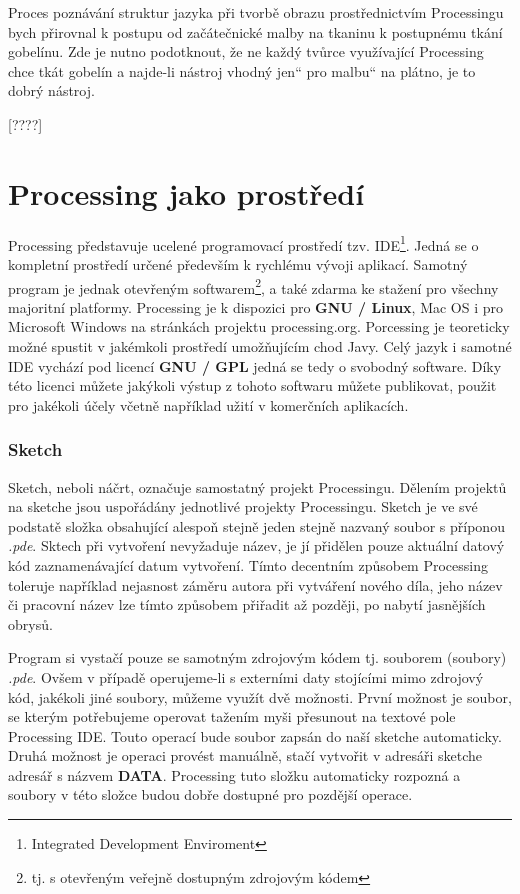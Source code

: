 \documentclass[11pt]{book}
\renewcommand\uv[1]{\quotedblbase #1\textquotedblleft}%
\newcommand{\pododdil}[1]{\subsection{#1}\label{subsec:#1}}
\newcommand{\slovnik}[1]{\textbf{\gls{#1}}\index{#1}}
\begin{document}
Proces poznávání struktur jazyka při tvorbě obrazu prostřednictvím Processingu bych přirovnal k postupu od začátečnické malby na tkaninu k postupnému tkání gobelínu. Zde je nutno podotknout, že ne každý tvůrce využívající Processing chce tkát gobelín a najde-li nástroj vhodný \uv{jen} pro \uv{malbu} na plátno, je to dobrý nástroj.


[????]

\chapter{Processing jako prostředí}


Processing představuje ucelené programovací prostředí tzv. IDE\footnote{Integrated Development Enviroment}. Jedná se o kompletní prostředí určené především k rychlému vývoji aplikací. Samotný program je jednak otevřeným softwarem\footnote{tj. s otevřeným veřejně dostupným zdrojovým kódem}, a také zdarma ke stažení pro všechny majoritní platformy. Processing je k dispozici pro \slovnik{GNU / Linux}, Mac OS i pro Microsoft Windows na stránkách projektu processing.org. Porcessing je teoreticky možné spustit v jakémkoli prostředí umožňujícím chod Javy. Celý jazyk i samotné IDE vychází pod licencí \slovnik{GNU / GPL} jedná se tedy o svobodný software. Díky této licenci můžete jakýkoli výstup z tohoto softwaru můžete publikovat, použit pro jakékoli účely včetně například užití v komerčních aplikacích.


\pododdil{Sketch}

Sketch, neboli náčrt, označuje samostatný projekt Processingu. Dělením projektů na sketche jsou uspořádány jednotlivé projekty Processingu. Sketch je ve své podstatě složka obsahující alespoň stejně jeden stejně nazvaný soubor s příponou {\em *.pde}. Sktech při vytvoření nevyžaduje název, je jí přidělen pouze aktuální datový kód zaznamenávající datum vytvoření. Tímto decentním způsobem Processing toleruje například nejasnost záměru autora při vytváření nového díla, jeho název či pracovní název lze tímto způsobem přiřadit až později, po nabytí jasnějších obrysů.

Program si vystačí pouze se samotným zdrojovým kódem tj. souborem (soubory) {\em *.pde}. Ovšem v případě operujeme-li s externími daty stojícími mimo zdrojový kód, jakékoli jiné soubory, můžeme využít dvě možnosti. První možnost je soubor, se kterým potřebujeme operovat tažením myši přesunout na textové pole Processing IDE. Touto operací bude soubor zapsán do naší sketche automaticky. Druhá možnost je operaci provést manuálně, stačí vytvořit v adresáři sketche adresář s názvem \slovnik{DATA}. Processing tuto složku automaticky rozpozná a soubory v této složce budou dobře dostupné pro pozdější operace.
\end{document}
